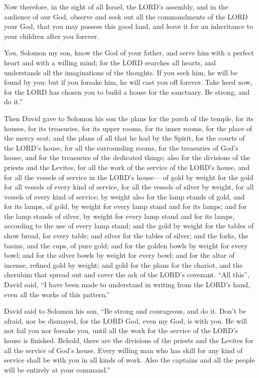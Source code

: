\myverse{}Now therefore, in the sight of all Israel, the LORD’s assembly,
and in the audience of our God, observe and seek out all the commandments of the LORD your God, that you
may possess this good land, and leave it for an inheritance to your children after you forever.

\myverse{}You, Solomon my son, know the God of your father, and serve him
with a perfect heart and with a willing mind; for the LORD searches all hearts, and understands all the
imaginations of the thoughts. If you seek him, he will be found by you; but if you forsake him, he will
cast you off forever.
\myverse{}Take heed now, for the LORD has chosen you to build a house for the sanctuary.
Be strong, and do it.”

\myverse{}Then David gave to Solomon his son the plans for the porch of
the temple, for its houses, for its treasuries, for its upper rooms, for its inner rooms, for the place
of the mercy seat;
\myverse{}and the plans of all that he had by the Spirit, for the courts of the LORD’s
house, for all the surrounding rooms, for the treasuries of God’s house, and for the treasuries of the
dedicated things;
\myverse{}also for the divisions of the priests and the Levites, for all the work of
the service of the LORD’s house, and for all the vessels of service in the LORD’s house—
\myverse{}of gold by weight for the gold for all vessels of every kind of service,
for all the vessels of silver by weight, for all vessels of every kind of service;
\myverse{}by weight also for the lamp stands of gold, and for its lamps, of gold, by
weight for every lamp stand and for its lamps; and for the lamp stands of silver, by weight for every
lamp stand and for its lamps, according to the use of every lamp stand;
\myverse{}and the gold by weight for the tables of show bread, for every table; and
silver for the tables of silver;
\myverse{}and the forks, the basins, and the cups, of pure gold; and for the golden
bowls by weight for every bowl; and for the silver bowls by weight for every bowl;
\myverse{}and for the altar of incense, refined gold by weight; and gold for the plans
for the chariot, and the cherubim that spread out and cover the ark of the LORD’s covenant.
\myverse{}“All this”, David said, “I have been made to understand in writing from the
LORD’s hand, even all the works of this pattern.”

\myverse{}David said to Solomon his son, “Be strong and courageous, and
do it. Don’t be afraid, nor be dismayed, for the LORD God, even my God, is with you. He will not fail
you nor forsake you, until all the work for the service of the LORD’s house is finished.
\myverse{}Behold, there are the divisions of the priests and the Levites for all the
service of God’s house. Every willing man who has skill for any kind of service shall be with you in all
kinds of work. Also the captains and all the people will be entirely at your command.”


